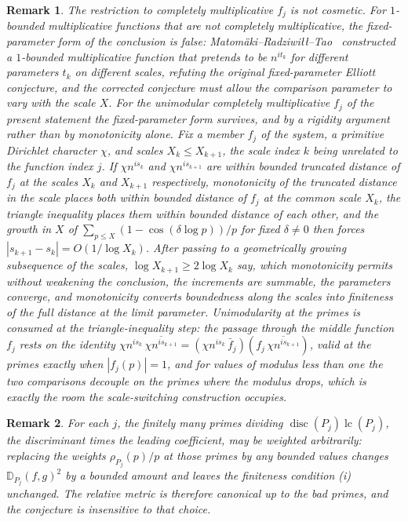 \documentclass[11pt]{article}
\newtheorem{remark}{Remark}
\theoremstyle{definition}
\begin{document}
\begin{remark}\label{t1:cm}
The restriction to completely multiplicative $f_j$ is not cosmetic.
For $1$-bounded multiplicative functions that are not completely
multiplicative, the fixed-parameter form of the conclusion is false:
Matom\"aki--Radziwi\l\l--Tao~\cite{MRT15} constructed a $1$-bounded multiplicative
function that pretends to be $n^{it_k}$ for different parameters $t_k$
on different scales, refuting the original fixed-parameter Elliott
conjecture, and the corrected conjecture must allow the comparison
parameter to vary with the scale $X$.  For the unimodular completely multiplicative $f_j$ of the present statement the fixed-parameter form survives, and by a rigidity argument rather than by monotonicity alone.  Fix a member $f_j$ of the system, a primitive Dirichlet character $\chi$, and scales $X_k\le X_{k+1}$, the scale index $k$ being unrelated to the function index $j$. If $\chi n^{is_k}$ and $\chi n^{is_{k+1}}$ are within bounded truncated distance of $f_j$ at the scales $X_k$ and $X_{k+1}$ respectively, monotonicity of the truncated distance in the scale places both within bounded distance of $f_j$ at the common scale $X_k$, the triangle inequality places them within bounded distance of each other, and the growth in $X$ of $\sum_{p\le X}(1-\cos(\delta\log p))/p$ for fixed $\delta\ne0$ then forces $|s_{k+1}-s_k|=O(1/\log X_k)$. After passing to a geometrically growing subsequence of the scales, $\log X_{k+1}\ge2\log X_k$ say, which monotonicity permits without weakening the conclusion, the increments are summable, the parameters converge, and monotonicity converts boundedness along the scales into finiteness of the full distance at the limit parameter. Unimodularity at the primes is consumed at the triangle-inequality step: the passage through the middle function $f_j$ rests on the identity $\chi n^{is_k}\,\overline{\chi n^{is_{k+1}}}=(\chi n^{is_k}\,\bar f_j)(f_j\,\overline{\chi n^{is_{k+1}}})$, valid at the primes exactly when $|f_j(p)|=1$, and for values of modulus less than one the two comparisons decouple on the primes where the modulus drops, which is exactly the room the scale-switching construction occupies.
\end{remark}

\begin{remark}\label{t1:badprimes}
For each $j$, the finitely many primes dividing
$\operatorname{disc}(P_j)\operatorname{lc}(P_j)$, the discriminant
times the leading coefficient, may be weighted arbitrarily: replacing
the weights $\rho_{P_j}(p)/p$ at those primes by any bounded values
changes $\mathbb D_{P_j}(f,g)^2$ by a bounded amount and leaves the
finiteness condition (i) unchanged.  The relative metric is therefore
canonical up to the bad primes, and the conjecture is insensitive to
that choice.
\end{remark}
\end{document}
